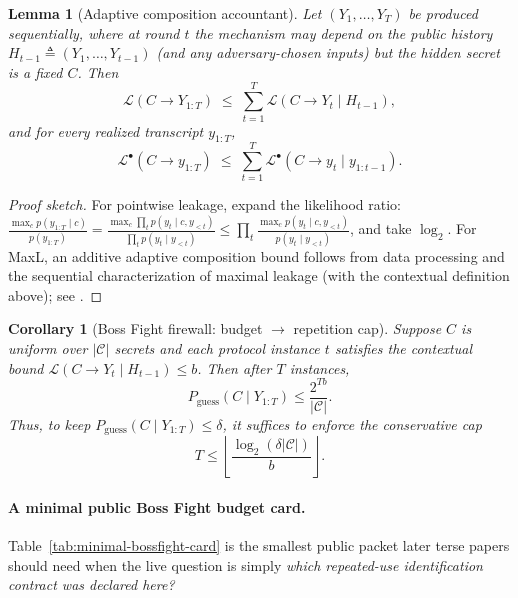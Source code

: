 \documentclass[11pt]{article}
\newcommand{\MaxL}{\mathcal{L}}
\newcommand{\PML}{\mathcal{L}^{\bullet}}
\newcommand{\logtwo}{\log_2}
\newcommand{\C}{\mathcal{C}} %
\newtheorem{lemma}{Lemma}
\newtheorem{corollary}{Corollary}
\begin{document}
\begin{lemma}[Adaptive composition accountant]\label{lem:adaptive}
Let $(Y_1,\dots,Y_T)$ be produced sequentially, where at round $t$ the mechanism may depend on the public history $H_{t-1}\triangleq (Y_1,\dots,Y_{t-1})$ (and any adversary-chosen inputs) but the hidden secret is a fixed $C$.
Then
\[
\MaxL(C\!\to\!Y_{1:T}) \;\le\; \sum_{t=1}^{T}\MaxL(C\!\to\!Y_t \mid H_{t-1}),
\]
and for every realized transcript $y_{1:T}$,
\[
\PML(C\!\to\!y_{1:T}) \;\le\; \sum_{t=1}^{T}\PML(C\!\to\!y_t \mid y_{1:t-1}).
\]
\end{lemma}
\begin{proof}[Proof sketch]
For pointwise leakage, expand the likelihood ratio:
$\frac{\max_c p(y_{1:T}\mid c)}{p(y_{1:T})}
=\frac{\max_c \prod_t p(y_t\mid c,y_{<t})}{\prod_t p(y_t\mid y_{<t})}
\le \prod_t \frac{\max_c p(y_t\mid c,y_{<t})}{p(y_t\mid y_{<t})}$,
and take $\logtwo$.
For MaxL, an additive adaptive composition bound follows from data processing and the sequential characterization of maximal leakage (with the contextual definition above); see \cite{issa2020operational,issa2022adaptive,saeidian2023pml}.
\end{proof}

\begin{corollary}[Boss Fight firewall: budget $\rightarrow$ repetition cap]\label{cor:firewall}
Suppose $C$ is uniform over $|\C|$ secrets and each protocol instance $t$ satisfies the contextual bound $\MaxL(C\!\to\!Y_t\mid H_{t-1})\le b$.
Then after $T$ instances,
\[
P_{\mathrm{guess}}(C\mid Y_{1:T})\le \frac{2^{Tb}}{|\C|}.
\]
Thus, to keep $P_{\mathrm{guess}}(C\mid Y_{1:T})\le \delta$, it suffices to enforce the conservative cap
\[
T \le \left\lfloor \frac{\logtwo(\delta|\C|)}{b}\right\rfloor.
\]
\end{corollary}

\paragraph{A minimal public Boss Fight budget card.}
Table~\ref{tab:minimal-bossfight-card} is the smallest public packet later terse papers should need when the live question is simply \emph{which repeated-use identification contract was declared here?}
\end{document}
